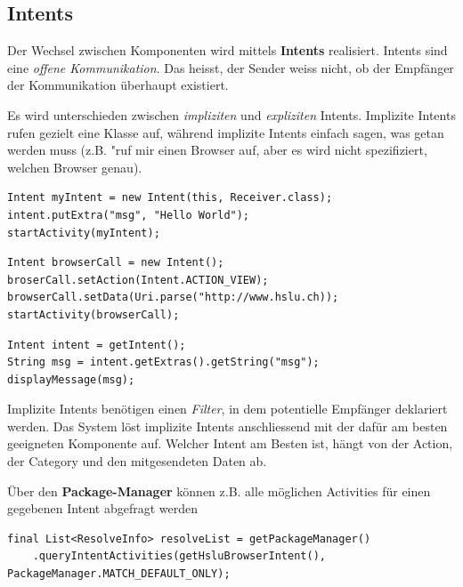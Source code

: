 \documentclass[a4paper, 11pt]{article}
\begin{document}
\subsection{Intents}
Der Wechsel zwischen Komponenten wird mittels \textbf{Intents} realisiert. Intents sind eine \textit{offene Kommunikation}. Das heisst, der Sender weiss nicht, ob der Empfänger der Kommunikation überhaupt existiert. 

Es wird unterschieden zwischen \textit{impliziten} und \textit{expliziten} Intents. Implizite Intents rufen gezielt eine Klasse auf, während implizite Intents einfach sagen, was getan werden muss (z.B. "ruf mir einen Browser auf, aber es wird nicht spezifiziert, welchen Browser genau). \\

\begin{lstlisting}[captionpos=b, caption={Beispiel eines expliziten Intents}]
Intent myIntent = new Intent(this, Receiver.class);
intent.putExtra("msg", "Hello World");
startActivity(myIntent);
\end{lstlisting}

\begin{lstlisting}[captionpos=b, caption={Beispiel eines impliziten Intents}]
Intent browserCall = new Intent();
broserCall.setAction(Intent.ACTION_VIEW);
browserCall.setData(Uri.parse("http://www.hslu.ch));
startActivity(browserCall);
\end{lstlisting}

\begin{lstlisting}[captionpos=b, caption={Empfangen und Auswerten eines Intents}]
Intent intent = getIntent();
String msg = intent.getExtras().getString("msg");
displayMessage(msg);
\end{lstlisting}

Implizite Intents benötigen einen \textit{Filter}, in dem potentielle Empfänger deklariert werden. Das System löst implizite Intents anschliessend mit der dafür am besten geeigneten Komponente auf. Welcher Intent am Besten ist, hängt von der Action, der Category und den mitgesendeten Daten ab.
\vspace{10px}

\noindent Über den \textbf{Package-Manager} können z.B. alle möglichen Activities für einen gegebenen Intent abgefragt werden

\begin{lstlisting}[caption={}]
final List<ResolveInfo> resolveList = getPackageManager()
	.queryIntentActivities(getHsluBrowserIntent(), PackageManager.MATCH_DEFAULT_ONLY);
\end{lstlisting}
\end{document}
